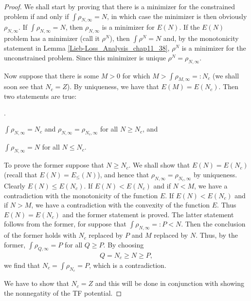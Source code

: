 \documentclass[openany, a4paper, oneside]{book}
\newcounter{enum2}
\renewenvironment{enumerate}{%
\begin{list}%
{%
\arabic{enum2}.\ \,%
}%
{%
\usecounter{enum2}
\setlength{\itemindent}{0pt}%
\setlength{\leftmargin}{6pt}%
\setlength{\rightmargin}{0pt}%
\setlength{\labelsep}{0pt}%
\setlength{\labelwidth}{6pt}%
\setlength{\itemsep}{0pt}%
\setlength{\parsep}{0pt}%
\setlength{\listparindent}{0pt}%
}
}{%
\end{list}%
}
\theoremstyle{break}
\theoremstyle{breakdefn}
\newcommand{\EleqN}{E_{\leq}(N)}
\newcommand{\rhoNinfty}{\rho_{N, \infty}}
\begin{document}
\begin{proof}
We shall start by proving that there is a minimizer for the constrained problem if and only if $\int \rhoNinfty = N$,
in which case the minimizer is then obviously $\rhoNinfty$.
If $\int \rhoNinfty = N$, then $\rhoNinfty$ is a minimizer for $E (N)$.
If the $E (N)$ problem has a minimizer (call it $\rho^N$), then $\int \rho^N = N$ and,
by the monotonicity statement in Lemma \ref{Lieb-Loss_Analysis_chap11_38}, $\rho^N$ is a minimizer for the unconstrained problem.
Since this minimizer is unique $\rho^N = \rhoNinfty$.

Now suppose that there is some $M > 0$ for which $M > \int \rho_{M, \infty} =: N_c$
(we shall soon see that $N_c = Z$).
By uniqueness, we have that $E (M) = E (N_c)$.
Then two statements are true:
\begin{enumerate}
\item $\int \rhoNinfty = N_c$ and $\rhoNinfty = \rho_{N_c, \infty}$ for all $N \geq N_c$, and
\item $\int \rhoNinfty = N$ for all $N \leq N_c$.
\end{enumerate}
To prove the former suppose that $N \geq N_c$.
We shall show that $E (N) = E (N_c)$ (recall that $E (N) = \EleqN$),
and hence that $\rhoNinfty = \rho_{N_c, \infty}$ by uniqueness.
Clearly $E (N) \leq E (N_c)$.
If $E (N) < E (N_c)$ and if $N<M$, we have a contradiction with the monotonicity of the function $E$.
If $E (N) < E (N_c)$ and if $N > M$, we have a contradiction with the convexity of the function $E$.
Thus $E (N) = E (N_c)$ and the former statement is proved.
The latter statement follows from the former,
for suppose that $\int \rhoNinfty =: P < N$.
Then the conclusion of the former holds with $N_c$ replaced by $P$ and $M$ replaced by $N$.
Thus, by the former, $\int \rho_{Q, \infty} = P$ for all $Q \geq P$.
By choosing
\begin{align}
 Q = N_c \geq N \geq P,
\end{align}
we find that $N_c = \int \rho_{N_c} = P$, which is a contradiction.

We have to show that $N_c = Z$ and this will be done in conjunction with showing the nonnegatity of the TF potential.


\end{proof}
\end{document}
